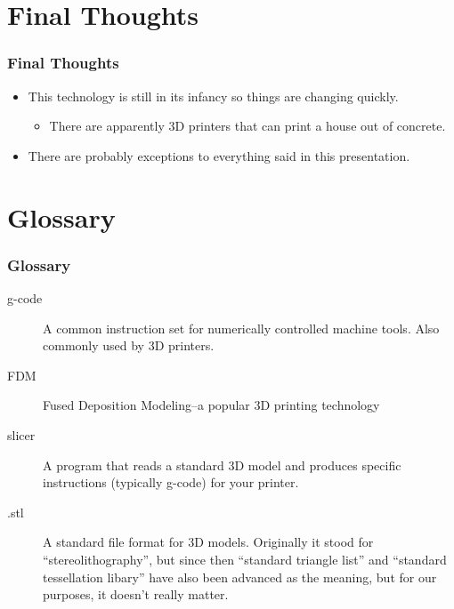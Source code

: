 \documentclass[english,10pt]{beamer}
\begin{document}
\section{Final Thoughts}
\begin{frame}
  \frametitle{Final Thoughts}
  \begin{itemize}
    \item This technology is still in its infancy so things are changing quickly.
    \begin{itemize}
      \item There are apparently 3D printers that can print a house out of concrete.
    \end{itemize}
    \item There are probably exceptions to everything said in this presentation.
  \end{itemize}
\end{frame}

\section{Glossary}
\begin{frame}
  \frametitle{Glossary}
  \begin{description}
    \item [g-code] A common instruction set for numerically controlled machine tools.  Also commonly used by 3D printers.
    \item [FDM] Fused Deposition Modeling--a popular 3D printing technology
    \item [slicer] A program that reads a standard 3D model and produces specific instructions (typically g-code) for your printer.
    \item [.stl] A standard file format for 3D models.  Originally it stood for ``stereolithography'',  but since then ``standard triangle list'' and ``standard tessellation libary'' have also been advanced as the meaning, but for our purposes, it doesn't really matter.
  \end{description}
\end{frame}
\end{document}
